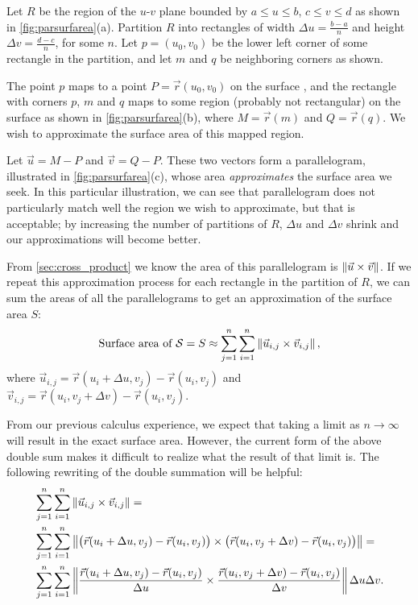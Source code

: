 Let $R$ be the region of the $u$-$v$ plane bounded by $a\leq u\leq b$, $c\leq v\leq d$ as shown in \autoref{fig:parsurfarea}(a). Partition $R$ into rectangles of width $\Delta u = \frac{b-a}n$ and height $\Delta v = \frac{d-c}n$, for some $n$. Let $p=(u_0,v_0)$ be the lower left corner of some rectangle in the partition, and let $m$ and $q$ be neighboring corners as shown.

The point $p$ maps to a point $P = \vec r(u_0,v_0)$ on the surface \surfaceS, and the rectangle with corners $p$, $m$ and $q$ maps to some region (probably not rectangular) on the surface as shown in \autoref{fig:parsurfarea}(b), where $M = \vec r(m)$ and $Q = \vec r(q)$. We wish to approximate the surface area of this mapped region.

Let $\vec u = M-P$ and $\vec v = Q-P$. These two vectors form a parallelogram, illustrated in \autoref{fig:parsurfarea}(c), whose area \emph{approximates} the surface area we seek. In this particular illustration, we can see that parallelogram does not particularly match well the region we wish to approximate, but that is acceptable; by increasing the number of partitions of $R$, $\Delta u$ and $\Delta v$ shrink and our approximations will become better.

From \autoref{sec:cross_product} we know the area of this parallelogram is $\left\lVert \vec u\times \vec v \right\rVert$. If we repeat this approximation process for each rectangle in the partition of $R$, we can sum the areas of all the parallelograms to get an approximation of the surface area $S$:
\[
\text{Surface area of \ensuremath{\mathcal{S}}} =S
\approx \sum_{j=1}^n\sum_{i=1}^n \left\lVert \vec u_{i,j}\times \vec v_{i,j} \right\rVert,
\]
where $\vec u_{i,j} = \vec r(u_i+\Delta u,v_j) - \vec r(u_i,v_j)$ and $\vec v_{i,j} = \vec r(u_i,v_j+\Delta v)-\vec r(u_i,v_j)$.

From our previous calculus experience, we expect that taking a limit as $n\to \infty$ will result in the exact surface area. However, the current form of the above double sum makes it difficult to realize what the result of that limit is. The following rewriting of the double summation will be helpful:
\begin{align*}
&\sum_{j=1}^n\sum_{i=1}^n \left\lVert \vec u_{i,j}\times \vec v_{i,j} \right\rVert= \\ 
&\sum_{j=1}^n\sum_{i=1}^n \left\lVert \bigl(\vec r(u_i+\Delta u,v_j) - \vec r(u_i,v_j)\bigr) \times \bigl(\vec r(u_i,v_j+\Delta v)-\vec r(u_i,v_j)\bigr) \right\rVert= \\
&\sum_{j=1}^n\sum_{i=1}^n \left\lVert \frac{\vec r(u_i+\Delta u,v_j) - \vec r(u_i,v_j)}{\Delta u} \times \frac{\vec r(u_i,v_j+\Delta v)-\vec r(u_i,v_j)}{\Delta v} \right\rVert\Delta u\Delta v.
\end{align*}

